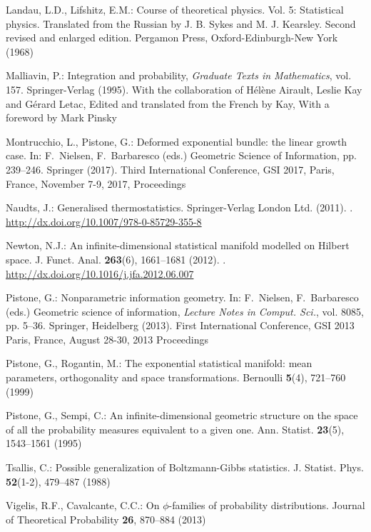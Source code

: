 \documentclass[graybox]{svmult}
\begin{document}
\begin{thebibliography}{10}
Landau, L.D., Lifshitz, E.M.: Course of theoretical physics. {V}ol. 5:
  {S}tatistical physics.
\newblock Translated from the Russian by J. B. Sykes and M. J. Kearsley. Second
  revised and enlarged edition. Pergamon Press, Oxford-Edinburgh-New York
  (1968)

Malliavin, P.: Integration and probability, \emph{Graduate Texts in
  Mathematics}, vol. 157.
\newblock Springer-Verlag (1995).
\newblock With the collaboration of Hélène Airault, Leslie Kay and Gérard
  Letac, Edited and translated from the French by Kay, With a foreword by Mark
  Pinsky

Montrucchio, L., Pistone, G.: Deformed exponential bundle: the linear growth
  case.
\newblock In: F.~Nielsen, F.~Barbaresco (eds.) Geometric Science of
  Information, pp. 239--246. Springer (2017).
\newblock Third International Conference, GSI 2017, Paris, France, November
  7-9, 2017, Proceedings

Naudts, J.: Generalised thermostatistics.
\newblock Springer-Verlag London Ltd. (2011).
\newblock {}.
\newblock \urlprefix\url{http://dx.doi.org/10.1007/978-0-85729-355-8}

Newton, N.J.: An infinite-dimensional statistical manifold modelled on
  {H}ilbert space.
\newblock J. Funct. Anal. \textbf{263}(6), 1661--1681 (2012).
\newblock {}.
\newblock \urlprefix\url{http://dx.doi.org/10.1016/j.jfa.2012.06.007}

Pistone, G.: Nonparametric information geometry.
\newblock In: F.~Nielsen, F.~Barbaresco (eds.) Geometric science of
  information, \emph{Lecture Notes in Comput. Sci.}, vol. 8085, pp. 5--36.
  Springer, Heidelberg (2013).
\newblock First International Conference, GSI 2013 Paris, France, August 28-30,
  2013 Proceedings

Pistone, G., Rogantin, M.: The exponential statistical manifold: mean
  parameters, orthogonality and space transformations.
\newblock Bernoulli \textbf{5}(4), 721--760 (1999)

Pistone, G., Sempi, C.: An infinite-dimensional geometric structure on the
  space of all the probability measures equivalent to a given one.
\newblock Ann. Statist. \textbf{23}(5), 1543--1561 (1995)

Tsallis, C.: Possible generalization of {B}oltzmann-{G}ibbs statistics.
\newblock J. Statist. Phys. \textbf{52}(1-2), 479--487 (1988)

Vigelis, R.F., Cavalcante, C.C.: On $\phi$-families of probability
  distributions.
\newblock Journal of Theoretical Probability \textbf{26}, 870--884 (2013)

\end{thebibliography}
\end{document}
